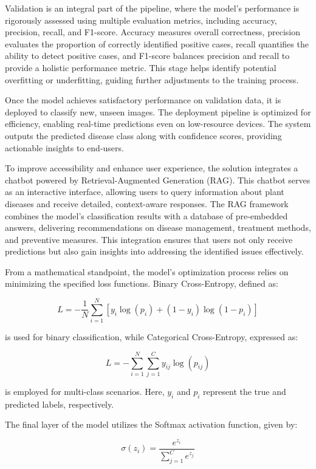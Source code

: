 Validation is an integral part of the pipeline, where the model’s performance is rigorously assessed using multiple evaluation metrics, including accuracy, precision, recall, and F1-score. Accuracy measures overall correctness, precision evaluates the proportion of correctly identified positive cases, recall quantifies the ability to detect positive cases, and F1-score balances precision and recall to provide a holistic performance metric. This stage helps identify potential overfitting or underfitting, guiding further adjustments to the training process.  

Once the model achieves satisfactory performance on validation data, it is deployed to classify new, unseen images. The deployment pipeline is optimized for efficiency, enabling real-time predictions even on low-resource devices. The system outputs the predicted disease class along with confidence scores, providing actionable insights to end-users.  

To improve accessibility and enhance user experience, the solution integrates a chatbot powered by Retrieval-Augmented Generation (RAG). This chatbot serves as an interactive interface, allowing users to query information about plant diseases and receive detailed, context-aware responses. The RAG framework combines the model’s classification results with a database of pre-embedded answers, delivering recommendations on disease management, treatment methods, and preventive measures. This integration ensures that users not only receive predictions but also gain insights into addressing the identified issues effectively.  

From a mathematical standpoint, the model’s optimization process relies on minimizing the specified loss functions. Binary Cross-Entropy, defined as:  

\[
L = -\frac{1}{N} \sum_{i=1}^{N} \left[ y_i \log(p_i) + (1 - y_i) \log(1 - p_i) \right]
\]  

is used for binary classification, while Categorical Cross-Entropy, expressed as:  

\[
L = -\sum_{i=1}^{N} \sum_{j=1}^{C} y_{ij} \log(p_{ij})
\]  

is employed for multi-class scenarios. Here, \( y_i \) and \( p_i \) represent the true and predicted labels, respectively.  

The final layer of the model utilizes the Softmax activation function, given by:  

\[
\sigma(z_i) = \frac{e^{z_i}}{\sum_{j=1}^{C} e^{z_j}}
\]  

